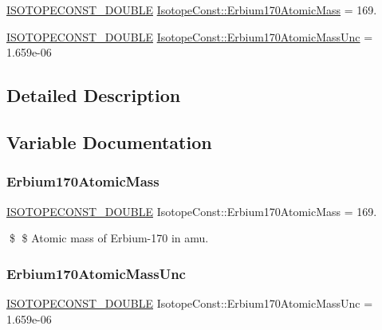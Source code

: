 \begin{DoxyCompactItemize}
\item 
\mbox{\hyperlink{group___isotope_const-_macros_ga8f45a7272ce02c0b4c65c44636ed719a}{I\+S\+O\+T\+O\+P\+E\+C\+O\+N\+S\+T\+\_\+\+D\+O\+U\+B\+LE}} \mbox{\hyperlink{group___isotope_const-_erbium-_er170_ga2c04473f3efe2a75b480097c633701c4}{Isotope\+Const\+::\+Erbium170\+Atomic\+Mass}} = 169.
\item 
\mbox{\hyperlink{group___isotope_const-_macros_ga8f45a7272ce02c0b4c65c44636ed719a}{I\+S\+O\+T\+O\+P\+E\+C\+O\+N\+S\+T\+\_\+\+D\+O\+U\+B\+LE}} \mbox{\hyperlink{group___isotope_const-_erbium-_er170_gaa917f3e94368e86d3e5a79ca6a9ae979}{Isotope\+Const\+::\+Erbium170\+Atomic\+Mass\+Unc}} = 1.\+659e-\/06
\end{DoxyCompactItemize}


\subsection{Detailed Description}


\subsection{Variable Documentation}
\mbox{\label{group___isotope_const-_erbium-_er170_ga2c04473f3efe2a75b480097c633701c4}} 
\subsubsection{\texorpdfstring{Erbium170\+Atomic\+Mass}{Erbium170AtomicMass}}
{\footnotesize\ttfamily \mbox{\hyperlink{group___isotope_const-_macros_ga8f45a7272ce02c0b4c65c44636ed719a}{I\+S\+O\+T\+O\+P\+E\+C\+O\+N\+S\+T\+\_\+\+D\+O\+U\+B\+LE}} Isotope\+Const\+::\+Erbium170\+Atomic\+Mass = 169.}

\$ \$ Atomic mass of Erbium-\/170 in amu. \mbox{\label{group___isotope_const-_erbium-_er170_gaa917f3e94368e86d3e5a79ca6a9ae979}} 
\subsubsection{\texorpdfstring{Erbium170\+Atomic\+Mass\+Unc}{Erbium170AtomicMassUnc}}
{\footnotesize\ttfamily \mbox{\hyperlink{group___isotope_const-_macros_ga8f45a7272ce02c0b4c65c44636ed719a}{I\+S\+O\+T\+O\+P\+E\+C\+O\+N\+S\+T\+\_\+\+D\+O\+U\+B\+LE}} Isotope\+Const\+::\+Erbium170\+Atomic\+Mass\+Unc = 1.\+659e-\/06}

